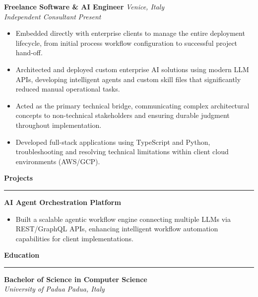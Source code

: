 \documentclass[11pt,a4paper]{article}
\begin{document}
\noindent\textbf{Freelance Software \& AI Engineer} \hfill \textit{Venice, Italy}\\
\textit{Independent Consultant} \hfill \textit{Present}
\begin{itemize}[leftmargin=*, nosep]
    \item Embedded directly with enterprise clients to manage the entire deployment lifecycle, from initial process workflow configuration to successful project hand-off.
    \item Architected and deployed custom enterprise AI solutions using modern LLM APIs, developing intelligent agents and custom skill files that significantly reduced manual operational tasks.
    \item Acted as the primary technical bridge, communicating complex architectural concepts to non-technical stakeholders and ensuring durable judgment throughout implementation.
    \item Developed full-stack applications using TypeScript and Python, troubleshooting and resolving technical limitations within client cloud environments (AWS/GCP).
\end{itemize}

\vspace{1em}

\noindent\textbf{\Large Projects}
\vspace{0.5em}\hrule\vspace{0.5em}
\noindent\textbf{AI Agent Orchestration Platform}
\begin{itemize}[leftmargin=*, nosep]
    \item Built a scalable agentic workflow engine connecting multiple LLMs via REST/GraphQL APIs, enhancing intelligent workflow automation capabilities for client implementations.
\end{itemize}

\vspace{1em}

\noindent\textbf{\Large Education}
\vspace{0.5em}\hrule\vspace{0.5em}
\noindent\textbf{Bachelor of Science in Computer Science}\\
\textit{University of Padua} \hfill \textit{Padua, Italy}
\end{document}

